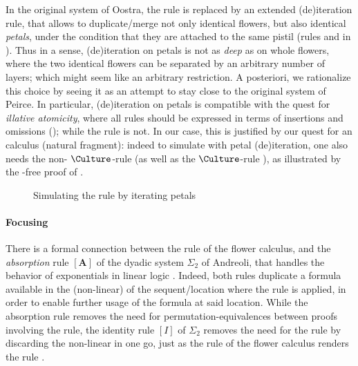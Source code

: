 \begin{scope}
In the original  system of Oostra, the  rule is replaced by an
extended (de)iteration rule, that allows to duplicate/merge not only identical
flowers, but also identical \emph{petals}, under the condition that they are
attached to the same pistil (rules 
and  in ). Thus in a sense, (de)iteration
on petals is not as \emph{deep} as on whole flowers, where the two identical
flowers can be separated by an arbitrary number of layers; which might seem like
an arbitrary restriction. A posteriori, we rationalize this choice by seeing it
as an attempt to stay close to the original system  of Peirce. In
particular, (de)iteration on petals is compatible with the quest for
\emph{illative atomicity}, where all rules should be expressed in terms of
insertions and omissions (); while the  rule is not.
In our case, this is justified by our quest for an \emph{} calculus
(natural fragment): indeed to simulate  with petal (de)iteration, one
also needs the non- $\Culture$-rule  (as well as the
$\Culture$-rule ), as illustrated by the -free proof of
.

\begin{figure}
  
  \caption{Simulating the  rule by iterating petals}
\end{figure}

\paragraph{Focusing}

There is a formal connection between the  rule of the flower
calculus, and the \emph{absorption} rule $[\mathbf{A}]$ of the dyadic system
$\Sigma_2$ of Andreoli, that handles the  behavior of exponentials in
linear logic . Indeed, both rules duplicate a formula
available in the (non-linear)  of the sequent/location where the rule is
applied, in order to enable further usage of the formula at said location. While
the absorption rule removes the need for permutation-equivalences between proofs
involving the \emph{} rule, the identity rule $[I]$ of $\Sigma_2$
removes the need for the \emph{} rule by discarding the non-linear
 in one go, just as the  rule of the flower calculus renders
the  rule .


\end{scope}
